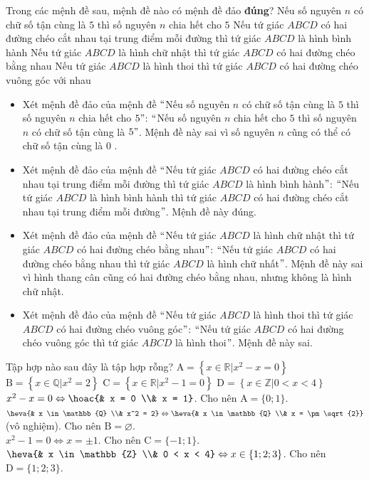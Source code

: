 \begin{ex}%
Trong các mệnh đề sau, mệnh đề nào có mệnh đề đảo \textbf{đúng}?
\choice
{Nếu số nguyên $n$ có chữ số tận cùng là $5$ thì số nguyên $n$ chia hết cho $5$}
{\True Nếu tứ giác $ABCD$ có hai đường chéo cắt nhau tại trung điểm mỗi đường thì tứ giác $ABCD$ là hình bình hành}
{Nếu tứ giác $ABCD$ là hình chữ nhật thì tứ giác $ABCD$ có hai đường chéo bằng nhau}
{Nếu tứ giác $ABCD$ là hình thoi thì tứ giác $ABCD$ có hai đường chéo vuông góc với nhau}
\loigiai
{
\begin{itemize}
\item Xét mệnh đề đảo của mệnh đề $\lq\lq $Nếu số nguyên $n$ có chữ số tận cùng là $5$ thì số nguyên $n$ chia hết cho $5"$: $\lq\lq $Nếu số nguyên $n$ chia hết cho $5$ thì số nguyên $n$ có chữ số tận cùng là $5"$. Mệnh đề này sai vì số nguyên $n$ cũng có thể có chữ số tận cùng là $0$ .
\item Xét mệnh đề đảo của mệnh đề $\lq\lq $Nếu tứ giác $ABCD$ có hai đường chéo cắt nhau tại trung điểm mỗi đường thì tứ giác $ABCD$ là hình bình hành$"$: $\lq\lq $Nếu tứ giác $ABCD$ là hình bình hành thì tứ giác $ABCD$ có hai đường chéo cắt nhau tại trung điểm mỗi đường$"$. Mệnh đề này đúng.
\item Xét mệnh đề đảo của mệnh đề $\lq\lq $Nếu tứ giác $ABCD$ là hình chữ nhật thì tứ giác $ABCD$ có hai đường chéo bằng nhau$"$: $\lq\lq $Nếu tứ giác $ABCD$ có hai đường chéo bằng nhau thì tứ giác $ABCD$ là hình chữ nhất$"$. Mệnh đề này sai vì hình thang cân cũng có hai đường chéo bằng nhau, nhưng không là hình chữ nhật.
\item Xét mệnh đề đảo của mệnh đề $\lq\lq $Nếu tứ giác $ABCD$ là hình thoi thì tứ giác $ABCD$ có hai đường chéo vuông góc$"$: $\lq\lq $Nếu tứ giác $ABCD$ có hai đường chéo vuông góc thì tứ giác $ABCD$ là hình thoi$"$. Mệnh đề này sai.

\end{itemize}
}
\end{ex}

\begin{ex}%
Tập hợp nào sau đây là tập hợp rỗng?
\choice
{$\mathrm{A}= \left\{x \in \mathbb{R} \vert x^2 - x = 0 \right\}$}
{\True $\mathrm{B}= \left\{x \in \mathbb{Q} \vert x^2 = 2 \right\}$}
{$\mathrm{C}= \left\{x \in \mathbb{R} \vert x^2 - 1 = 0 \right\}$}
{$\mathrm{D}= \left\{x \in \mathbb{Z} \vert 0 < x < 4 \right\}$}
\loigiai
{
$x^2 - x = 0 \Leftrightarrow \hoac{& x = 0 \\& x = 1}$. Cho nên $\mathrm{A} = \{0;1\}$.\\
$\heva{& x \in \mathbb{Q} \\& x^2 = 2} \Leftrightarrow \heva{& x \in \mathbb{Q} \\& x = \pm \sqrt{2}}$ (vô nghiệm). Cho nên $\mathrm{B} = \varnothing$.\\
$x^2 - 1 = 0 \Leftrightarrow x = \pm 1$. Cho nên $\mathrm{C} = \{-1;1\}$.\\
$\heva{& x \in \mathbb{Z} \\& 0 < x < 4} \Leftrightarrow x \in \{1;2;3\}$. Cho nên $\mathrm{D} = \{1;2;3\}$.
}
\end{ex}

